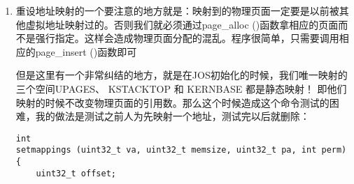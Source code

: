 \documentclass{article}
\newcommand{\funcname}[1]{{\ttfamily \small #1}}
\begin{document}
\begin{CJK*}{UTF8}{gkai}
\begin{enumerate}
{\begin{lstlisting}[style=ccode, title={\scriptsize \ttfamily \bfseries kern/monitor.c}]
    uint32_t lva = strtol (argv[1], 0, 0);
    uint32_t uva = strtol (argv[2], 0, 0);

    if (lva != ROUNDUP (lva, PGSIZE) ||
        uva != ROUNDUP (uva, PGSIZE) ||
        lva > uva) {
        cprintf ("showmappings: Invalid address\n");
        return 0;
    }

    showmappings (lva, uva);

    return 0;
}
\end{lstlisting}

测试的时候有三个地区可以看看，我们前面只做过三个地址的映射： UPAGES 、 KSTACKTOP 和 KERNBASE，我们看看UPAGES和KERNBASE：UPAGES地址为0xef000000，KERNBASE为0xf0000000：

\vspace{2em}

\begin{lstlisting}[style=console]
Welcome to the JOS kernel monitor!
Type 'help' for a list of commands.
K> showmappings 0xef000000 0xef008000
0xef000000 - 0xef001000     0x118000   user: read only
0xef001000 - 0xef002000     0x119000   user: read only
0xef002000 - 0xef003000     0x11a000   user: read only
0xef003000 - 0xef004000     0x11b000   user: read only
0xef004000 - 0xef005000     0x11c000   user: read only
0xef005000 - 0xef006000     0x11d000   user: read only
0xef006000 - 0xef007000     0x11e000   user: read only
0xef007000 - 0xef008000     0x11f000   user: read only
K> showmappings 0xf0000000 0xf0004000
0xf0000000 - 0xf0001000     0x0   kernel: read/write
0xf0001000 - 0xf0002000     0x1000   kernel: read/write
0xf0002000 - 0xf0003000     0x2000   kernel: read/write
0xf0003000 - 0xf0004000     0x3000   kernel: read/write
K> 
\end{lstlisting}
}

\item{重设地址映射的一个要注意的地方就是：映射到的物理页面一定要是以前被其他虚拟地址映射过的。否则我们就必须通过\funcname{page\_alloc ()}函数拿相应的页面而不是强行指定。这样会造成物理页面分配的混乱。程序很简单，只需要调用相应的\funcname{page\_insert ()}函数即可

但是这里有一个非常纠结的地方，就是在JOS初始化的时候，我们唯一映射的三个空间UPAGES、 KSTACKTOP 和 KERNBASE 都是静态映射！ 即他们映射的时候不改变物理页面的引用数。那么这个时候造成这个命令测试的困难，我的做法是测试之前人为先映射一个地址，测试完以后就删除：

\begin{lstlisting}[style=ccode, title={\scriptsize \ttfamily \bfseries kern/monitor.c}]
int
setmappings (uint32_t va, uint32_t memsize, uint32_t pa, int perm)
{
    uint32_t offset;


\end{lstlisting}}
\end{enumerate}
\end{CJK*}
\end{document}
